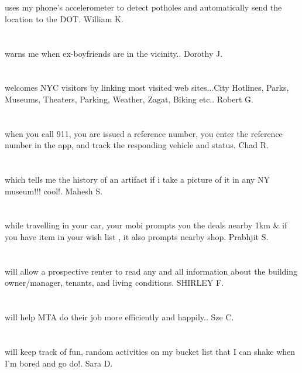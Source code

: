 \section{}uses my phone's accelerometer to detect potholes and automatically send the location to the DOT. William K.
\section{}warns me when ex-boyfriends are in the vicinity.. Dorothy J.
\section{}welcomes NYC visitors by linking most visited web sites...City Hotlines,  Parks,  Museums,  Theaters,  Parking,  Weather,  Zagat,  Biking etc.. Robert G.
\section{}when you call 911,  you are issued a reference number,  you enter the reference number in the app,  and track the responding vehicle and status. Chad R.
\section{}which tells me the history of an artifact if i take a picture of it in any NY museum!!! cool!. Mahesh S.
\section{}while travelling in your car,  your mobi prompts you the deals nearby 1km \& if you have item in your wish list , it also prompts nearby shop. Prabhjit S.
\section{}will allow a prospective renter to read any and all information about the building owner/manager,  tenants, and living conditions. SHIRLEY F.
\section{}will help MTA do their job more efficiently and happily.. Sze C.
\section{}will keep track of fun,  random activities on my bucket list that I can shake when I'm bored and go do!. Sara D.
